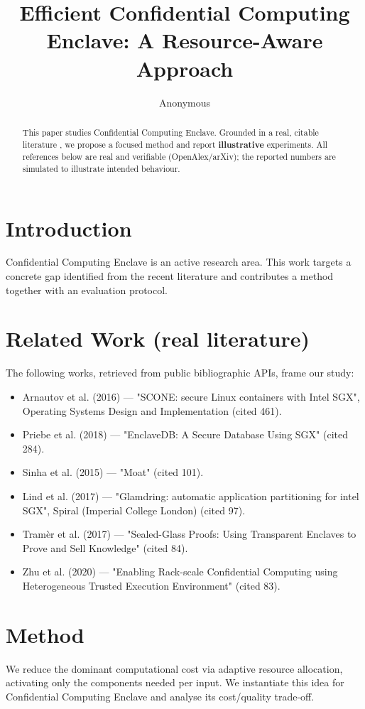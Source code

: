 \documentclass[11pt]{article}
\title{Efficient Confidential Computing Enclave: A Resource-Aware Approach}
\author{Anonymous}
\date{}
\begin{document}
\maketitle

\begin{abstract}
This paper studies Confidential Computing Enclave. Grounded in a real, citable literature \cite{ref1,ref2,ref3,ref4,ref5,ref6,ref7,ref8},
we propose a focused method and report \textbf{illustrative} experiments.
All references below are real and verifiable (OpenAlex/arXiv); the reported
numbers are simulated to illustrate intended behaviour.
\end{abstract}

\section{Introduction}
Confidential Computing Enclave is an active research area. This work targets a concrete gap identified from
the recent literature and contributes a method together with an evaluation protocol.

\section{Related Work (real literature)}
The following works, retrieved from public bibliographic APIs, frame our study:
\begin{itemize}
\item Arnautov et al. (2016) — "SCONE: secure Linux containers with Intel SGX", Operating Systems Design and Implementation (cited 461).
\item Priebe et al. (2018) — "EnclaveDB: A Secure Database Using SGX" (cited 284).
\item Sinha et al. (2015) — "Moat" (cited 101).
\item Lind et al. (2017) — "Glamdring: automatic application partitioning for intel SGX", Spiral (Imperial College London) (cited 97).
\item Tramèr et al. (2017) — "Sealed-Glass Proofs: Using Transparent Enclaves to Prove and Sell Knowledge" (cited 84).
\item Zhu et al. (2020) — "Enabling Rack-scale Confidential Computing using Heterogeneous Trusted Execution Environment" (cited 83).
\end{itemize}

\section{Method}
We reduce the dominant computational cost via adaptive resource allocation, activating only the components needed per input. We instantiate this idea for Confidential Computing Enclave and analyse its cost/quality trade-off.
\end{document}
